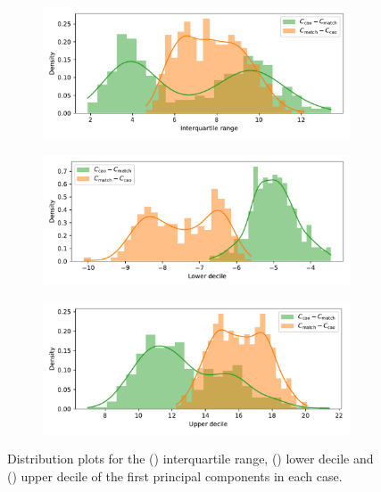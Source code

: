 \documentclass[11pt]{article}
\newcommand{\imgwidth}{.85\textwidth}
\begin{document}
\begin{figure}
    \centering
    \begin{subfigure}{\imgwidth}
        \includegraphics[width=\linewidth]{Fig11a.pdf}
        \caption{}\label{fig:edo_iqr}
    \end{subfigure}\vfill%

    \begin{subfigure}{\imgwidth}
        \includegraphics[width=\linewidth]{Fig11b.pdf}
        \caption{}\label{fig:edo_lower}
    \end{subfigure}\vfill%
    
    \begin{subfigure}{\imgwidth}
        \includegraphics[width=\linewidth]{Fig11c.pdf}
        \caption{}\label{fig:edo_upper}
    \end{subfigure}
    \caption{Distribution plots for the () interquartile
        range, () lower decile and
        () upper decile of the first principal components
        in each case.}\label{fig:edo_quantiles}
\end{figure}
\end{document}
